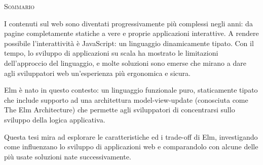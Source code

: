 \begin{center}
  \textsc{Sommario}
\end{center}
\noindent

I contenuti sul web sono diventati progressivamente più complessi negli anni: da pagine completamente statiche a vere e proprie applicazioni interattive. A rendere possibile l'interattività è JavaScript: un linguaggio dinamicamente tipato. Con il tempo, lo sviluppo di applicazioni su scala ha mostrato le limitazioni dell'approccio del linguaggio, e molte soluzioni sono emerse che mirano a dare agli sviluppatori web un'esperienza più ergonomica e sicura.

Elm è nato in questo contesto: un linguaggio funzionale puro, staticamente tipato che include supporto ad una architettura model-view-update (conosciuta come The Elm Architecture) che permette agli sviluppatori di concentrarsi sullo sviluppo della logica applicativa.

Questa tesi mira ad esplorare le caratteristiche ed i trade-off di Elm, investigando come influenzano lo sviluppo di applicazioni web e comparandolo con alcune delle più usate soluzioni nate successivamente.
